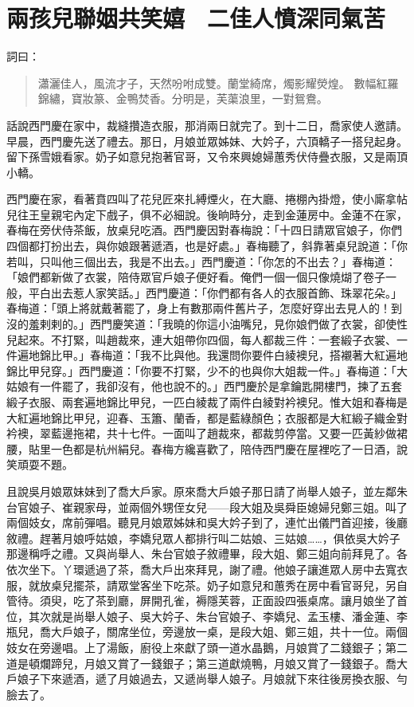 
\chapter{兩孩兒聯姻共笑嬉　二佳人憤深同氣苦}

詞曰：
\begin{quote}
瀟灑佳人，風流才子，天然吩咐成雙。蘭堂綺席，燭影耀熒煌。
數幅紅羅錦繡，寶妝篆、金鴨焚香。分明是，芙蕖浪里，一對鴛鴦。
\end{quote}

話說西門慶在家中，裁縫攢造衣服，那消兩日就完了。到十二日，喬家使人邀請。早晨，西門慶先送了禮去。那日，月娘並眾姊妹、大妗子，六頂轎子一搭兒起身。留下孫雪娥看家。奶子如意兒抱著官哥，又令來興媳婦蕙秀伏侍疊衣服，又是兩頂小轎。

西門慶在家，看著賁四叫了花兒匠來扎縛煙火，在大廳、捲棚內掛燈，使小廝拿帖兒往王皇親宅內定下戲子，俱不必細說。後晌時分，走到金蓮房中。金蓮不在家，春梅在旁伏侍茶飯，放桌兒吃酒。西門慶因對春梅說：「十四日請眾官娘子，你們四個都打扮出去，與你娘跟著遞酒，也是好處。」春梅聽了，斜靠著桌兒說道：「你若叫，只叫他三個出去，我是不出去。」西門慶道：「你怎的不出去？」春梅道：「娘們都新做了衣裳，陪侍眾官戶娘子便好看。俺們一個一個只像燒煳了卷子一般，平白出去惹人家笑話。」西門慶道：「你們都有各人的衣服首飾、珠翠花朵。」春梅道：「頭上將就戴著罷了，身上有數那兩件舊片子，怎麼好穿出去見人的！到沒的羞剌剌的。」西門慶笑道：「我曉的你這小油嘴兒，見你娘們做了衣裳，卻使性兒起來。不打緊，叫趙裁來，連大姐帶你四個，每人都裁三件：一套緞子衣裳、一件遍地錦比甲。」春梅道：「我不比與他。我還問你要件白綾襖兒，搭襯著大紅遍地錦比甲兒穿。」西門慶道：「你要不打緊，少不的也與你大姐裁一件。」春梅道：「大姑娘有一件罷了，我卻沒有，他也說不的。」西門慶於是拿鑰匙開樓門，揀了五套緞子衣服、兩套遍地錦比甲兒，一匹白綾裁了兩件白綾對衿襖兒。惟大姐和春梅是大紅遍地錦比甲兒，迎春、玉簫、蘭香，都是藍綠顏色；衣服都是大紅緞子織金對衿襖，翠藍邊拖裙，共十七件。一面叫了趙裁來，都裁剪停當。又要一匹黃紗做裙腰，貼里一色都是杭州絹兒。春梅方纔喜歡了，陪侍西門慶在屋裡吃了一日酒，說笑頑耍不題。

且說吳月娘眾妹妹到了喬大戶家。原來喬大戶娘子那日請了尚舉人娘子，並左鄰朱台官娘子、崔親家母，並兩個外甥侄女兒——段大姐及吳舜臣媳婦兒鄭三姐。叫了兩個妓女，席前彈唱。聽見月娘眾姊妹和吳大妗子到了，連忙出儀門首迎接，後廳敘禮。趕著月娘呼姑娘，李嬌兒眾人都排行叫二姑娘、三姑娘……，俱依吳大妗子那邊稱呼之禮。又與尚舉人、朱台官娘子敘禮畢，段大姐、鄭三姐向前拜見了。各依次坐下。丫環遞過了茶，喬大戶出來拜見，謝了禮。他娘子讓進眾人房中去寬衣服，就放桌兒擺茶，請眾堂客坐下吃茶。奶子如意兒和蕙秀在房中看官哥兒，另自管待。須臾，吃了茶到廳，屏開孔雀，褥隱芙蓉，正面設四張桌席。讓月娘坐了首位，其次就是尚舉人娘子、吳大妗子、朱台官娘子、李嬌兒、孟玉樓、潘金蓮、李瓶兒，喬大戶娘子，關席坐位，旁邊放一桌，是段大姐、鄭三姐，共十一位。兩個妓女在旁邊唱。上了湯飯，廚役上來獻了頭一道水晶鵝，月娘賞了二錢銀子；第二道是頓爛蹄兒，月娘又賞了一錢銀子；第三道獻燒鴨，月娘又賞了一錢銀子。喬大戶娘子下來遞酒，遞了月娘過去，又遞尚舉人娘子。月娘就下來往後房換衣服、勻臉去了。

